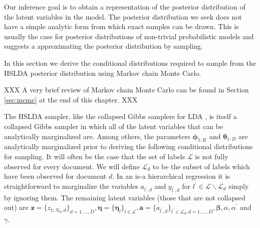 
\label{sec:inference}
Our inference goal  is to obtain a representation of the posterior distribution
of the latent variables in the model.  The posterior distribution we seek does not have a simple analytic form from which exact samples can be drawn.
This is usually the case for posterior distributions of non-trivial
probabilistic models and suggests a approximating the posterior distribution by sampling.

In this section we derive the conditional distributions required to sample from the HSLDA posterior distribution using Markov chain Monte Carlo. 

XXX  A very brief review of Markov chain Monte Carlo can be found in Section \ref{sec:mcmc} at the end of this chapter.  XXX

The HSLDA sampler, like the collapsed Gibbs samplers for LDA \cite{Griffiths04}, is itself a collapsed Gibbs sampler in which all of the latent variables that can be analytically marginalized are.  Among others, the parameters $\boldsymbol{\phi}_{1:K}$
and $\boldsymbol{\theta}_{1:D}$ are analytically marginalized prior to deriving the following conditional distributions for sampling.  
  It will often be the
case that the set of labels $\mathcal{L}$ is not fully observed for
every document. We will define $\mathcal{L}_{d}$ to be the subset
of labels which have been observed for document $d$. In an is-a hierarchical regression  it is straightforward
to marginalize the variables $a_{l^{\prime},d}$ and $y_{l^{\prime},d}$
for $l^{\prime}\in\mathcal{L}\backslash\mathcal{L}_{d}$ simply by ignoring them. 
 The remaining latent variables (those that are not collapsed out) are $\mathbf{z}=\{z_{1:N_{d},d}\}_{d=1,\ldots,D},\boldsymbol\eta=\{\boldsymbol\eta_{l}\}_{l\in\mathcal{L}},\mathbf{a}=\{a_{l^{\prime},d}\}_{l^{\prime}\in\mathcal{L}_{d},d=1,\ldots,D},\boldsymbol\beta,\alpha,\alpha^{\prime}$
and $\gamma$.


